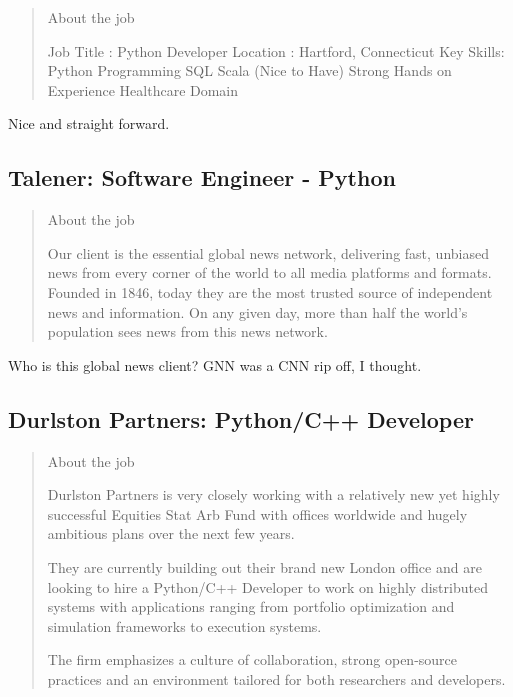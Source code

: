 \documentclass[
	letterpaper, %
	12pt, %
]{CSSullivanBusinessReport}
\begin{document}
\begin{quote}
	About the job
	
	Job Title : Python Developer
	Location : Hartford, Connecticut
	Key Skills:
	Python Programming
	SQL
	Scala (Nice to Have)
	Strong Hands on Experience
	Healthcare Domain


\end{quote}

Nice and straight forward.  

\subsection[Talener]{Talener: Software Engineer - Python}

\begin{quote}
	About the job
	
	Our client is the essential global news network, delivering fast, unbiased news from every corner of the world to all media platforms and formats. Founded in 1846, today they are the most trusted source of independent news and information. On any given day, more than half the world's population sees news from this news network.


\end{quote}

Who is this global news client? GNN was a CNN rip off, I thought.

\subsection[Durlston Partners]{Durlston Partners: Python/C++ Developer}

\begin{quote}
	About the job
	
	Durlston Partners is very closely working with a relatively new yet highly successful Equities Stat Arb Fund with offices worldwide and hugely ambitious plans over the next few years.

	They are currently building out their brand new London office and are looking to hire a Python/C++ Developer to work on highly distributed systems with applications ranging from portfolio optimization and simulation frameworks to execution systems.

	The firm emphasizes a culture of collaboration, strong open-source practices and an environment tailored for both researchers and developers.

\end{quote}
\end{document}
